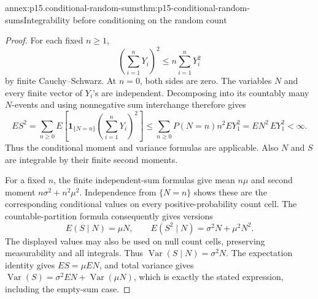 \begin{annexitem}{annex:p15.conditional-random-sums}{thm:p15-conditional-random-sums}{Integrability before conditioning on the random count}
\begin{proof}
For each fixed \(n\geq1\),
\[
                    \left(\sum_{i=1}^nY_i\right)^2
                                \leq n\sum_{i=1}^nY_i^2
\]
by finite Cauchy--Schwarz. At \(n=0\), both sides are zero.
The variables \(N\) and every finite vector of \(Y_i\)'s are independent.
Decomposing into its countably many \(N\)-events and using nonnegative
sum interchange therefore gives
\[
 ES^2
    =\sum_{n\geq0}E\left[\mathbf1_{\{N=n\}}
                        \left(\sum_{i=1}^nY_i\right)^2\right]
    \leq\sum_{n\geq0}P(N=n)n^2EY_1^2
    =EN^2\,EY_1^2<\infty.
\]
Thus the conditional moment and variance formulas are applicable.
Also \(N\) and \(S\) are integrable by their finite second moments.

For a fixed \(n\), the finite independent-sum formulas give
mean \(n\mu\) and second moment \(n\sigma^2+n^2\mu^2\).
Independence from \(\{N=n\}\) shows these are the corresponding
conditional values on every positive-probability count cell.
The countable-partition formula consequently gives versions
\[
              E(S\mid N)=\mu N,\qquad
              E(S^2\mid N)=\sigma^2N+\mu^2N^2.
\]
The displayed values may also be used on null count cells, preserving
measurability and all integrals.
Thus \(\operatorname{Var}(S\mid N)=\sigma^2N\).
The expectation identity gives \(ES=\mu EN\), and total variance
gives
\(\operatorname{Var}(S)=\sigma^2EN+\operatorname{Var}(\mu N)\),
which is exactly the stated expression, including the empty-sum case.
\end{proof}
\end{annexitem}


